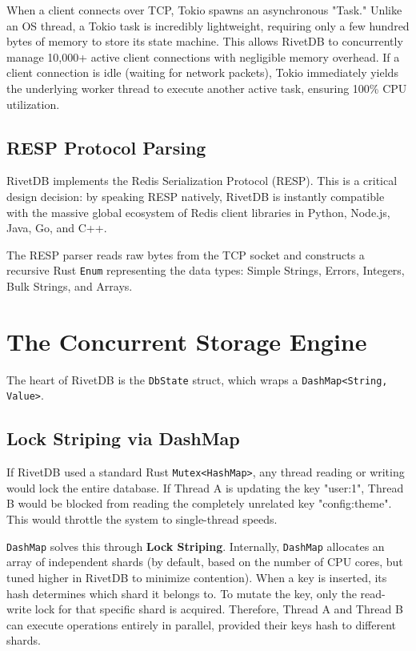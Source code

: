 When a client connects over TCP, Tokio spawns an asynchronous "Task." Unlike an OS thread, a Tokio task is incredibly lightweight, requiring only a few hundred bytes of memory to store its state machine. This allows RivetDB to concurrently manage 10,000+ active client connections with negligible memory overhead. If a client connection is idle (waiting for network packets), Tokio immediately yields the underlying worker thread to execute another active task, ensuring 100\% CPU utilization.

\subsection{RESP Protocol Parsing}
RivetDB implements the Redis Serialization Protocol (RESP). This is a critical design decision: by speaking RESP natively, RivetDB is instantly compatible with the massive global ecosystem of Redis client libraries in Python, Node.js, Java, Go, and C++.

The RESP parser reads raw bytes from the TCP socket and constructs a recursive Rust \texttt{Enum} representing the data types: Simple Strings, Errors, Integers, Bulk Strings, and Arrays.

\section{The Concurrent Storage Engine}

The heart of RivetDB is the \texttt{DbState} struct, which wraps a \texttt{DashMap<String, Value>}. 

\subsection{Lock Striping via DashMap}
If RivetDB used a standard Rust \texttt{Mutex<HashMap>}, any thread reading or writing would lock the entire database. If Thread A is updating the key "user:1", Thread B would be blocked from reading the completely unrelated key "config:theme". This would throttle the system to single-thread speeds.

\texttt{DashMap} solves this through \textbf{Lock Striping}. Internally, \texttt{DashMap} allocates an array of independent shards (by default, based on the number of CPU cores, but tuned higher in RivetDB to minimize contention). When a key is inserted, its hash determines which shard it belongs to. To mutate the key, only the read-write lock for that specific shard is acquired. Therefore, Thread A and Thread B can execute operations entirely in parallel, provided their keys hash to different shards. 

